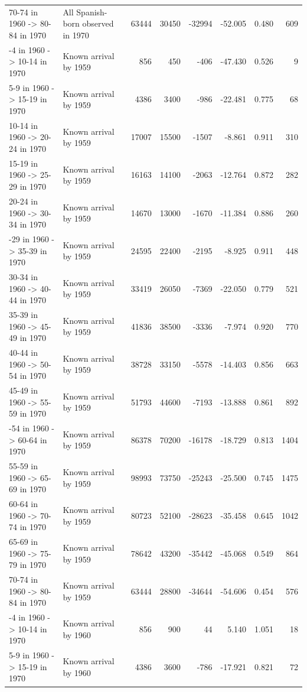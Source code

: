\begin{table}
\begin{tabular}[t]{llrrrrrr}
70-74 in 1960 -> 80-84 in 1970 & All Spanish-born observed in 1970 & 63444 & 30450 & -32994 & -52.005 & 0.480 & 609\\
\addlinespace
0-4 in 1960 -> 10-14 in 1970 & Known arrival by 1959 & 856 & 450 & -406 & -47.430 & 0.526 & 9\\
5-9 in 1960 -> 15-19 in 1970 & Known arrival by 1959 & 4386 & 3400 & -986 & -22.481 & 0.775 & 68\\
10-14 in 1960 -> 20-24 in 1970 & Known arrival by 1959 & 17007 & 15500 & -1507 & -8.861 & 0.911 & 310\\
15-19 in 1960 -> 25-29 in 1970 & Known arrival by 1959 & 16163 & 14100 & -2063 & -12.764 & 0.872 & 282\\
20-24 in 1960 -> 30-34 in 1970 & Known arrival by 1959 & 14670 & 13000 & -1670 & -11.384 & 0.886 & 260\\
\addlinespace
25-29 in 1960 -> 35-39 in 1970 & Known arrival by 1959 & 24595 & 22400 & -2195 & -8.925 & 0.911 & 448\\
30-34 in 1960 -> 40-44 in 1970 & Known arrival by 1959 & 33419 & 26050 & -7369 & -22.050 & 0.779 & 521\\
35-39 in 1960 -> 45-49 in 1970 & Known arrival by 1959 & 41836 & 38500 & -3336 & -7.974 & 0.920 & 770\\
40-44 in 1960 -> 50-54 in 1970 & Known arrival by 1959 & 38728 & 33150 & -5578 & -14.403 & 0.856 & 663\\
45-49 in 1960 -> 55-59 in 1970 & Known arrival by 1959 & 51793 & 44600 & -7193 & -13.888 & 0.861 & 892\\
\addlinespace
50-54 in 1960 -> 60-64 in 1970 & Known arrival by 1959 & 86378 & 70200 & -16178 & -18.729 & 0.813 & 1404\\
55-59 in 1960 -> 65-69 in 1970 & Known arrival by 1959 & 98993 & 73750 & -25243 & -25.500 & 0.745 & 1475\\
60-64 in 1960 -> 70-74 in 1970 & Known arrival by 1959 & 80723 & 52100 & -28623 & -35.458 & 0.645 & 1042\\
65-69 in 1960 -> 75-79 in 1970 & Known arrival by 1959 & 78642 & 43200 & -35442 & -45.068 & 0.549 & 864\\
70-74 in 1960 -> 80-84 in 1970 & Known arrival by 1959 & 63444 & 28800 & -34644 & -54.606 & 0.454 & 576\\
\addlinespace
0-4 in 1960 -> 10-14 in 1970 & Known arrival by 1960 & 856 & 900 & 44 & 5.140 & 1.051 & 18\\
5-9 in 1960 -> 15-19 in 1970 & Known arrival by 1960 & 4386 & 3600 & -786 & -17.921 & 0.821 & 72\\

\end{tabular}
\end{table}
